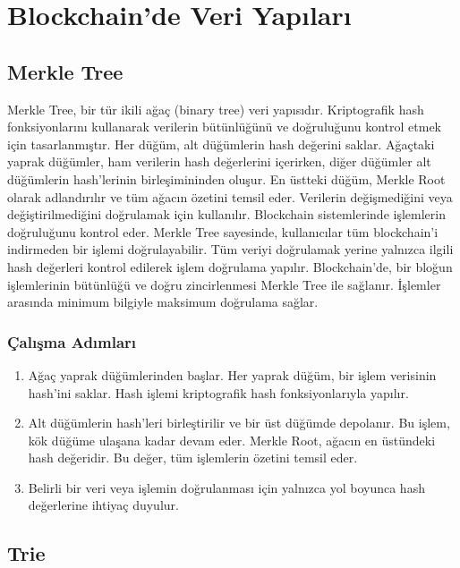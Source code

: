 \section{Blockchain'de Veri Yapıları}

\subsection{Merkle Tree}

Merkle Tree, bir tür ikili ağaç (binary tree) veri yapısıdır. Kriptografik hash fonksiyonlarını kullanarak verilerin bütünlüğünü ve doğruluğunu kontrol etmek için tasarlanmıştır. Her düğüm, alt düğümlerin hash değerini saklar. Ağaçtaki yaprak düğümler, ham verilerin hash değerlerini içerirken, diğer düğümler alt düğümlerin hash'lerinin birleşimininden oluşur. En üstteki düğüm, Merkle Root olarak adlandırılır ve tüm ağacın özetini temsil eder. Verilerin değişmediğini veya değiştirilmediğini doğrulamak için kullanılır. Blockchain sistemlerinde işlemlerin doğruluğunu kontrol eder. Merkle Tree sayesinde, kullanıcılar tüm blockchain'i indirmeden bir işlemi doğrulayabilir. Tüm veriyi doğrulamak yerine yalnızca ilgili hash değerleri kontrol edilerek işlem doğrulama yapılır. Blockchain'de, bir bloğun işlemlerinin bütünlüğü ve doğru zincirlenmesi Merkle Tree ile sağlanır. İşlemler arasında minimum bilgiyle maksimum doğrulama sağlar.

\subsubsection{Çalışma Adımları}

\begin{enumerate}
    \item Ağaç yaprak düğümlerinden başlar. Her yaprak düğüm, bir işlem verisinin hash’ini saklar. Hash işlemi kriptografik hash fonksiyonlarıyla yapılır.
    \item Alt düğümlerin hash’leri birleştirilir ve bir üst düğümde depolanır. Bu işlem, kök düğüme ulaşana kadar devam eder. Merkle Root, ağacın en üstündeki hash değeridir. Bu değer, tüm işlemlerin özetini temsil eder.
    \item Belirli bir veri veya işlemin doğrulanması için yalnızca yol boyunca hash değerlerine ihtiyaç duyulur.
\end{enumerate}

\newpage

\subsection{Trie}


